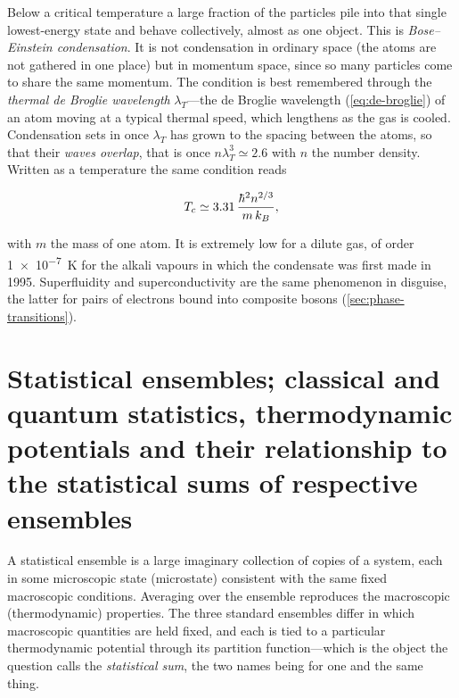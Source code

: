         Below a critical temperature a large fraction of the particles pile into that single lowest-energy state and behave collectively, almost as one object. This is \emph{Bose--Einstein condensation}. It is not condensation in ordinary space (the atoms are not gathered in one place) but in momentum space, since so many particles come to share the same momentum. The condition is best remembered through the \emph{thermal de Broglie wavelength} $\lambda_{T}$---the de Broglie wavelength (\cref{eq:de-broglie}) of an atom moving at a typical thermal speed, which lengthens as the gas is cooled. Condensation sets in once $\lambda_{T}$ has grown to the spacing between the atoms, so that their \emph{waves overlap}, that is once $n\lambda_{T}^{3} \simeq 2.6$ with $n$ the number density. Written as a temperature the same condition reads

        \begin{equation*}
            T_c \simeq 3.31\,\frac{\hbar^2 n^{2/3}}{m\,k_{B}},
        \end{equation*}

        with $m$ the mass of one atom. It is extremely low for a dilute gas, of order \qty{1e-7}{\kelvin} for the alkali vapours in which the condensate was first made in 1995. Superfluidity and superconductivity are the same phenomenon in disguise, the latter for pairs of electrons bound into composite bosons (\cref{sec:phase-transitions}).

\section{Statistical ensembles; classical and quantum statistics, thermodynamic potentials and their relationship to the statistical sums of respective ensembles}
\label{sec:ensembles}

    A statistical ensemble is a large imaginary collection of copies of a system, each in some microscopic state (microstate) consistent with the same fixed macroscopic conditions. Averaging over the ensemble reproduces the macroscopic (thermodynamic) properties. The three standard ensembles differ in which macroscopic quantities are held fixed, and each is tied to a particular thermodynamic potential through its partition function---which is the object the question calls the \emph{statistical sum}, the two names being for one and the same thing.

